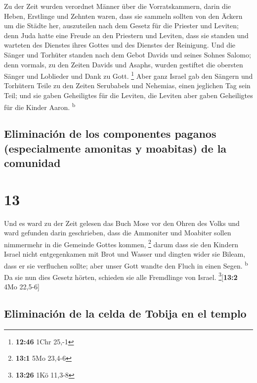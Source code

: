  Zu der Zeit wurden verordnet Männer über die
Vorratskammern, darin die Heben, Erstlinge und Zehnten waren, dass sie
sammeln sollten von den Äckern um die Städte her, auszuteilen nach dem
Gesetz für die Priester und Leviten; denn Juda hatte eine Freude an den
Priestern und Leviten, dass sie standen  und warteten des
Dienstes ihres Gottes und des Dienstes der Reinigung. Und die Sänger und
Torhüter standen nach dem Gebot Davids und seines Sohnes Salomo;
 denn vormals, zu den Zeiten Davids und Asaphs, wurden
gestiftet die obersten Sänger und Loblieder und Dank zu Gott.
\footnote{\textbf{12:46} 1Chr 25,-1}  Aber ganz Israel
gab den Sängern und Torhütern Teile zu den Zeiten Serubabels und
Nehemias, einen jeglichen Tag sein Teil; und sie gaben Geheiligtes für
die Leviten, die Leviten aber gaben Geheiligtes für die Kinder Aaron.
\textsuperscript{b}

\hypertarget{eliminaciuxf3n-de-los-componentes-paganos-especialmente-amonitas-y-moabitas-de-la-comunidad}{%
\subsection{Eliminación de los componentes paganos (especialmente
amonitas y moabitas) de la
comunidad}\label{eliminaciuxf3n-de-los-componentes-paganos-especialmente-amonitas-y-moabitas-de-la-comunidad}}

\hypertarget{section-12}{%
\section{13}\label{section-12}}

 Und es ward zu der Zeit gelesen das Buch Mose vor den
Ohren des Volks und ward gefunden darin geschrieben, dass die Ammoniter
und Moabiter sollen nimmermehr in die Gemeinde Gottes kommen,
\footnote{\textbf{13:1} 5Mo 23,4-6}  darum dass sie den
Kindern Israel nicht entgegenkamen mit Brot und Wasser und dingten wider
sie Bileam, dass er sie verfluchen sollte; aber unser Gott wandte den
Fluch in einen Segen. \textsuperscript{b}  Da sie nun dies
Gesetz hörten, schieden sie alle Fremdlinge von Israel.
\footnote{\textbf{13:26} 1Kö 11,3-8}{[}\textbf{13:2} 4Mo 22,5-6{]}

\hypertarget{eliminaciuxf3n-de-la-celda-de-tobija-en-el-templo}{%
\subsection{Eliminación de la celda de Tobija en el
templo}\label{eliminaciuxf3n-de-la-celda-de-tobija-en-el-templo}}

